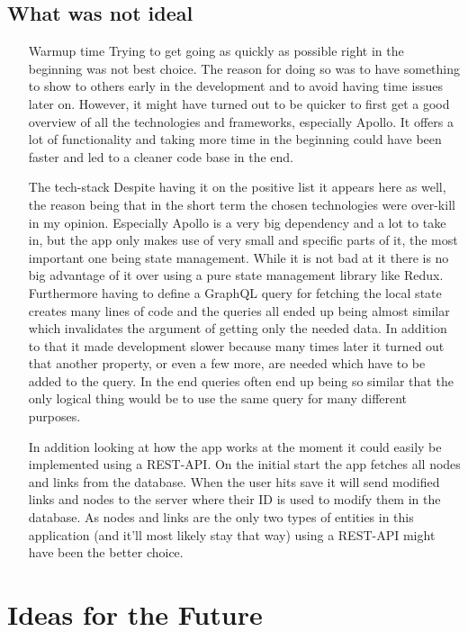 \section{What was not ideal}
\begin{itemize}
\item[Warmup time] Trying to get going as quickly as possible right in the beginning was not best choice. The reason for doing so was to have something to show to others early in the development and to avoid having time issues later on. However, it might have turned out to be quicker to first get a good overview of all the technologies and frameworks, especially Apollo. It offers a lot of functionality and taking more time in the beginning could have been faster and led to a cleaner code base in the end.

\item[The tech-stack] Despite having it on the positive list it appears here as well, the reason being that in the short term the chosen technologies were over-kill in my opinion. Especially Apollo is a very big dependency and a lot to take in, but the app only makes use of very small and specific parts of it, the most important one being state management. While it is not bad at it there is no big advantage of it over using a pure state management library like Redux. Furthermore having to define a GraphQL query for fetching the local state creates many lines of code and the queries all ended up being almost similar which invalidates the argument of getting only the needed data. In addition to that it made development slower because many times later it turned out that another property, or even a few more, are needed which have to be added to the query. In the end queries often end up being so similar that the only logical thing would be to use the same query for many different purposes.

In addition looking at how the app works at the moment it could easily be implemented using a REST-API. On the initial start the app fetches all nodes and links from the database. When the user hits save it will send modified links and nodes to the server where their ID is used to modify them in the database. As nodes and links are the only two types of entities in this application (and it'll most likely stay that way) using a REST-API might have been the better choice.
\end{itemize}


\chapter{Ideas for the Future}
\label{chap:Future}
